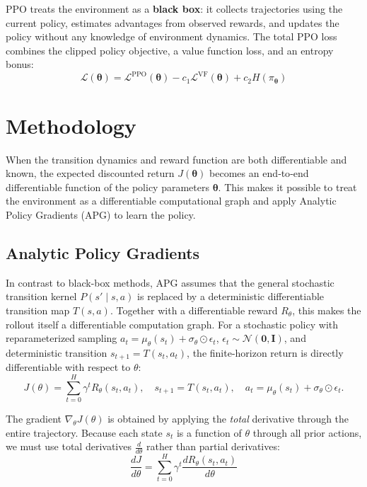 \documentclass[11pt,a4paper]{article}
\newcommand{\cL}{\mathcal{L}}
\newcommand{\btheta}{\bm{\theta}}
\begin{document}
PPO treats the environment as a \textbf{black box}: it collects trajectories using the current policy, estimates advantages from observed rewards, and updates the policy without any knowledge of environment dynamics. The total PPO loss combines the clipped policy objective, a value function loss, and an entropy bonus:
\begin{equation}
  \cL(\btheta) = \cL^{\text{PPO}}(\btheta) - c_1 \cL^{\text{VF}}(\btheta) + c_2 H(\pi_{\btheta})
  \label{eq:ppo_total}
\end{equation}

\section{Methodology}
\label{sec:methodology}
When the transition dynamics and reward function are both differentiable and known, the expected discounted return $J(\btheta)$ becomes an end‑to‑end differentiable function of the policy parameters $\btheta$. This makes it possible to treat the environment as a differentiable computational graph and apply Analytic Policy Gradients (APG) to learn the policy.

\subsection{Analytic Policy Gradients}
\label{sec:apg_concept}

In contrast to black-box methods, APG assumes that the general stochastic transition kernel $P(s' \mid s, a)$ is replaced by a deterministic differentiable transition map $T(s, a)$. Together with a differentiable reward $R_\theta$, this makes the rollout itself a differentiable computation graph. For a stochastic policy with reparameterized sampling $a_t = \mu_{\theta}(s_t) + \sigma_{\theta} \odot \epsilon_t$, $\epsilon_t \sim \mathcal{N}(\mathbf{0}, \mathbf{I})$, and deterministic transition $s_{t+1} = T(s_t, a_t)$, the finite-horizon return is directly differentiable with respect to $\theta$:
\begin{equation}
  J(\theta) = \sum_{t=0}^{H} \gamma^t R_{\theta}(s_t, a_t), \quad
  s_{t+1} = T(s_t, a_t), \quad
  a_t = \mu_{\theta}(s_t) + \sigma_{\theta} \odot \epsilon_t .
  \label{eq:apg_return}
\end{equation}

The gradient $\nabla_{\theta} J(\theta)$ is obtained by applying the \emph{total} derivative through the entire trajectory. Because each state $s_t$ is a function of $\theta$ through all prior actions, we must use total derivatives $\tfrac{d}{d\theta}$ rather than partial derivatives:
\begin{equation}
  \frac{d J}{d \theta}
  = \sum_{t=0}^{H} \gamma^t \frac{d R_{\theta}(s_t, a_t)}{d \theta}
  \label{eq:apg_grad}
\end{equation}
\end{document}
